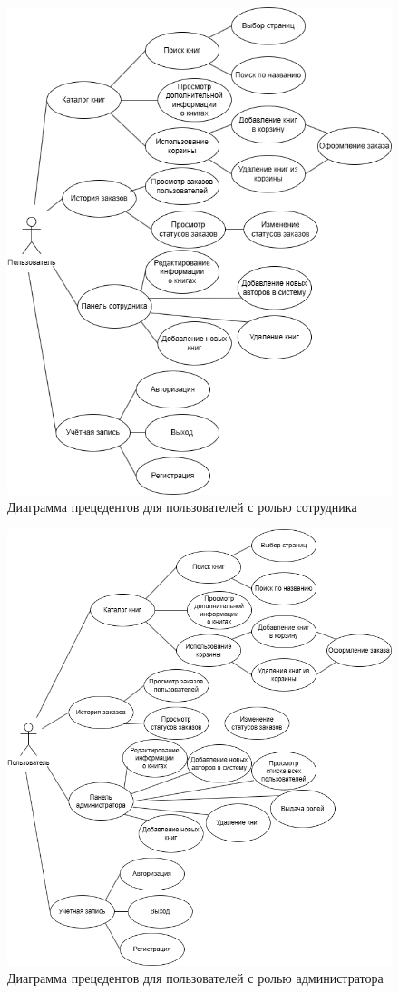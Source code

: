 \begin{figure}[H]
	\centering
	\includegraphics[width=0.7\linewidth]{"images/Сотрудники"}
	\caption{Диаграмма прецедентов для пользователей с ролью сотрудника}
	\label{fig:--}
\end{figure}

\begin{figure}[H]
	\centering
	\includegraphics[width=0.7\linewidth]{"images/Администраторы"}
	\caption{Диаграмма прецедентов для пользователей с ролью администратора}
	\label{fig:--}
\end{figure}



